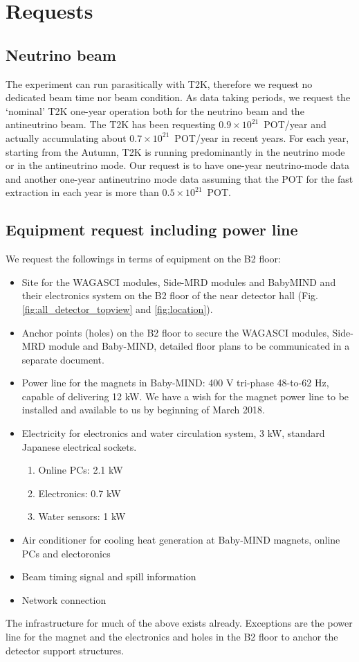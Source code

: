 \section{Requests}

\subsection{Neutrino beam}
The experiment can run parasitically with T2K, therefore we request no dedicated beam time nor beam condition.
As data taking periods, we request the `nominal' T2K one-year operation both for the neutrino beam and the antineutrino beam.
The T2K has been requesting $0.9\times10^{21}$~POT/year and actually accumulating about $0.7\times10^{21}$~POT/year in recent years.
For each year, starting from the Autumn,  T2K is running predominantly in the neutrino mode or in the antineutrino mode.
Our request is to have one-year neutrino-mode data and another one-year antineutrino mode data
assuming that the POT for the fast extraction in each year is more than $0.5\times10^{21}$~POT.

\subsection{Equipment request including power line}
We request the followings in terms of equipment on the B2 floor:
\begin{itemize}
\item {Site for the WAGASCI modules, Side-MRD modules and BabyMIND and their electronics system on the B2 floor of the near detector hall (Fig. \ref{fig:all_detector_topview} and \ref{fig:location}).}
\item {Anchor points (holes) on the B2 floor to secure the WAGASCI modules, Side-MRD module and Baby-MIND, detailed floor plans to be communicated in a separate document.}
\item {Power line for the magnets in Baby-MIND: 400 V tri-phase 48-to-62 Hz, capable of delivering 12 kW. We have a wish for the magnet power line to be installed and available to us by beginning of March 2018.}
\item Electricity for electronics and water circulation system, 3 kW, standard Japanese electrical sockets.
	\begin{enumerate}
		\item Online PCs: 2.1 kW
		\item Electronics: 0.7 kW
		\item Water sensors: 1 kW
	\end{enumerate}
\item Air conditioner for cooling heat generation at Baby-MIND magnets, online PCs and electoronics
\item Beam timing signal and spill information
\item Network connection
\end{itemize}

The infrastructure for much of the above exists already.
Exceptions are the power line for the magnet and the electronics and holes in the B2 floor to anchor the detector support structures.


